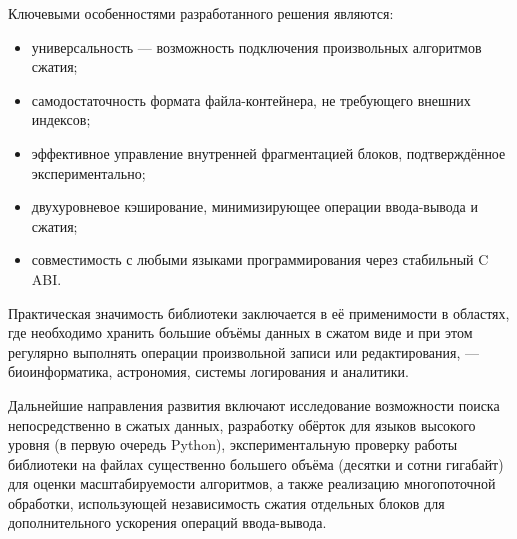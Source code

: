 Ключевыми особенностями разработанного решения являются:
\begin{itemize}
    \item универсальность — возможность подключения произвольных алгоритмов сжатия;
    \item самодостаточность формата файла-контейнера, не требующего внешних индексов;
    \item эффективное управление внутренней фрагментацией блоков, подтверждённое экспериментально;
    \item двухуровневое кэширование, минимизирующее операции ввода-вывода и сжатия;
    \item совместимость с любыми языками программирования через стабильный C ABI.
\end{itemize}

Практическая значимость библиотеки заключается в её применимости в областях, где необходимо хранить большие объёмы данных в сжатом виде и при этом регулярно выполнять операции произвольной записи или редактирования, — биоинформатика, астрономия, системы логирования и аналитики.

Дальнейшие направления развития включают исследование возможности поиска непосредственно в сжатых данных, разработку обёрток для языков высокого уровня (в первую очередь Python), экспериментальную проверку работы библиотеки на файлах существенно большего объёма (десятки и сотни гигабайт) для оценки масштабируемости алгоритмов, а также реализацию многопоточной обработки, использующей независимость сжатия отдельных блоков для дополнительного ускорения операций ввода-вывода.

